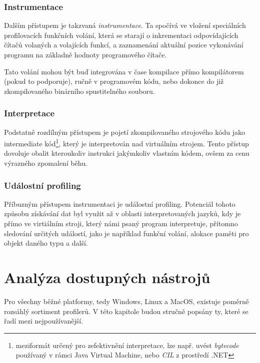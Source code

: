 \documentclass[czech,BP]{thesiskiv}
\begin{document}
\subsection{Instrumentace}

Dalším přístupem je takzvaná \emph{instrumentace}. Ta spočívá ve vložení speciálních profilovacích funkčních volání, která se starají o inkrementaci odpovídajících čítačů volaných a volajících funkcí, a zaznamenání aktuální pozice vykonávání programu na základně hodnoty programového čítače.

Tato volání mohou být buď integrována v čase kompilace přímo kompilátorem (pokud to podporuje), ručně v programovém kódu, nebo dokonce do již zkompilovaného binárního spustitelného souboru.

\subsection{Interpretace}

Podstatně rozdílným přístupem je pojetí zkompilovaného strojového kódu jako intermediate kód\footnote{meziformát určený pro zefektivnění interpretace, lze např. uvést \emph{bytecode} používaný v rámci Java Virtual Machine, nebo \emph{CIL} z prostředí .NET}, který je interpretován nad virtuálním strojem\cite{grind2}. Tento přístup dovoluje obalit kteroukoliv instrukci jakýmkoliv vlastním kódem, ovšem za cenu výrazného zpomalení běhu.

\subsection{Událostní profiling}

Příbuzným přístupem instrumentaci je událostní profiling. Potenciál tohoto způsobu získávání dat byl využit až v oblasti interpretovaných jazyků, kdy je přímo ve virtiálním stroji, který námi psaný program interpretuje, přítomno sledování určitých událostí, jako je například funkční volání, alokace paměti pro objekt daného typu a další.


\newpage

\chapter{Analýza dostupných nástrojů}

Pro všechny běžné platformy, tedy Windows, Linux a MacOS, existuje poměrně rozsáhlý sortiment profilerů. V této kapitole budou stručně popsány ty, které se řadí mezi nejpoužívanější.
\end{document}
